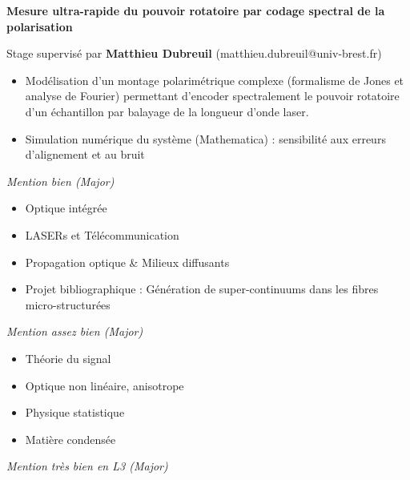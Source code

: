 \documentclass[9pt,a4paper,academicons]{altacv}
\begin{document}

\textbf{Mesure ultra-rapide du pouvoir rotatoire par codage spectral de la
	polarisation}\smallskip
	
	Stage supervisé par \textbf{Matthieu Dubreuil} (matthieu.dubreuil@univ-brest.fr)
	\smallskip
\small{
	\begin{itemize}
		\item Modélisation d'un montage polarimétrique complexe (formalisme de Jones et analyse de Fourier) permettant d'encoder spectralement le pouvoir rotatoire d'un échantillon par balayage de la longueur d'onde laser.
		\item Simulation numérique du système (Mathematica) : sensibilité aux erreurs d'alignement et au bruit
	\end{itemize}
}





\hfill \textit{Mention bien (Major)}
\vspace{-1em}\small{
	
  \begin{itemize}
    \item Optique intégrée
    \item LASERs et Télécommunication
    \item Propagation optique \& Milieux diffusants
    \item Projet bibliographique : Génération de super-continuums dans les fibres micro-structurées
  \end{itemize}
}

\divider

\hfill\textit{Mention assez bien (Major)}
\vspace{-1em}\small{
  \begin{itemize}
    \item Théorie du signal
    \item Optique non linéaire, anisotrope
    \item Physique statistique
    \item Matière condensée
  \end{itemize}
}
\divider

\hfill \textit{Mention très bien en L3 (Major)}
\end{document}
